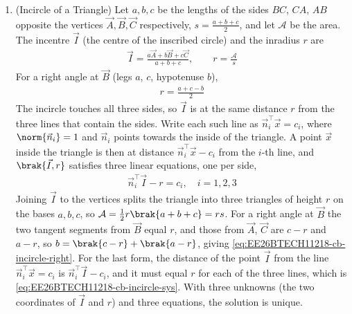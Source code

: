 \begin{enumerate}[label=\thesubsection.\arabic*, ref=\thesubsection.\theenumi,itemsep=1.5em]
\item (Incircle of a Triangle) Let $a,b,c$ be the lengths of the sides $BC$, $CA$, $AB$ opposite the vertices $\vec{A},\vec{B},\vec{C}$ respectively, $s=\frac{a+b+c}{2}$, and let $\mathcal{A}$ be the area. The incentre $\vec{I}$ (the centre of the inscribed circle) and the inradius $r$ are
\begin{align}
\vec{I} = \frac{a\vec{A}+b\vec{B}+c\vec{C}}{a+b+c}, \qquad r = \frac{\mathcal{A}}{s}
\label{eq:EE26BTECH11218-cb-incircle}
\end{align}
For a right angle at $\vec{B}$ (legs $a$, $c$, hypotenuse $b$),
\begin{align}
r = \frac{a+c-b}{2}
\label{eq:EE26BTECH11218-cb-incircle-right}
\end{align}
The incircle touches all three sides, so $\vec{I}$ is at the same distance $r$ from the three lines that contain the sides. Write each such line as $\vec{n}_i^{\top}\vec{x}=c_i$, where $\norm{\vec{n}_i}=1$ and $\vec{n}_i$ points towards the inside of the triangle. A point $\vec{x}$ inside the triangle is then at distance $\vec{n}_i^{\top}\vec{x}-c_i$ from the $i$-th line, and $\brak{\vec{I},r}$ satisfies three linear equations, one per side,
\begin{align}
\vec{n}_i^{\top}\vec{I} - r = c_i, \quad i = 1,2,3
\label{eq:EE26BTECH11218-cb-incircle-sys}
\end{align}
\solution Joining $\vec{I}$ to the vertices splits the triangle into three triangles of height $r$ on the bases $a,b,c$, so $\mathcal{A} = \frac{1}{2}r\brak{a+b+c} = rs$. For a right angle at $\vec{B}$ the two tangent segments from $\vec{B}$ equal $r$, and those from $\vec{A}$, $\vec{C}$ are $c-r$ and $a-r$, so $b = \brak{c-r}+\brak{a-r}$, giving \eqref{eq:EE26BTECH11218-cb-incircle-right}. For the last form, the distance of the point $\vec{I}$ from the line $\vec{n}_i^{\top}\vec{x}=c_i$ is $\vec{n}_i^{\top}\vec{I}-c_i$, and it must equal $r$ for each of the three lines, which is \eqref{eq:EE26BTECH11218-cb-incircle-sys}. With three unknowns (the two coordinates of $\vec{I}$ and $r$) and three equations, the solution is unique.


\end{enumerate}

